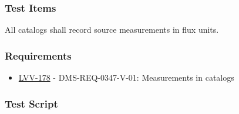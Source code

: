 \hypertarget{test-items-117}{%
\subsubsection{Test Items}\label{test-items-117}}

All catalogs shall record source measurements in flux units.

\hypertarget{requirements-118}{%
\subsubsection{Requirements}\label{requirements-118}}

\begin{itemize}
\tightlist
\item
  \href{https://jira.lsstcorp.org/browse/LVV-178}{LVV-178} -
  DMS-REQ-0347-V-01: Measurements in catalogs
\end{itemize}

\hypertarget{test-script-118}{%
\subsubsection{Test Script}\label{test-script-118}}

